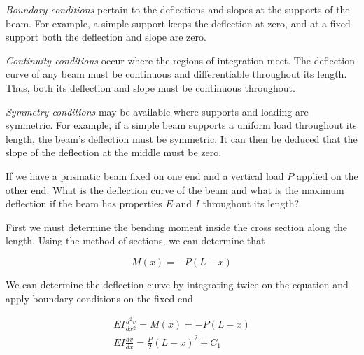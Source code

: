 \documentclass[
fontsize=10pt,
a4paper,
twosides=false,
open=any,
svgnames,
]{kaobook} %
\begin{document}
\emph{Boundary conditions} pertain to the deflections and slopes at the supports of the beam. For example, a simple support keeps the deflection at zero, and at a fixed support both the deflection and slope are zero.

\emph{Continuity conditions} occur where the regions of integration meet. The deflection curve of any beam must be continuous and differentiable throughout its length. Thus, both its deflection and slope must be continuous throughout.

\emph{Symmetry conditions} may be available where supports and loading are symmetric. For example, if a simple beam supports a uniform load throughout its length, the beam's deflection must be symmetric. It can then be deduced that the slope of the deflection at the middle must be zero.

\begin{example} \label{example: cantilever beam deflection}
  If we have a prismatic beam fixed on one end and a vertical load $P$ applied on the other end. What is the deflection curve of the beam and what is the maximum deflection if the beam has properties $E$ and $I$ throughout its length?

  \begin{figure}[H]
    \centering
  \end{figure}
  
First we must determine the bending moment inside the cross section along the length. Using the method of sections, we can determine that

\[M(x) =  - P(L - x)\]	

We can determine the deflection curve by integrating twice on the equation and apply boundary conditions on the fixed end

\begin{gather*}
  EI\frac{d^2v}{dx^2} = M(x) =  - P(L - x) \\
  EI\frac{dv}{dx} = \frac{P}{2}(L - x)^2 + C_1
\end{gather*}


\end{example}
\end{document}

